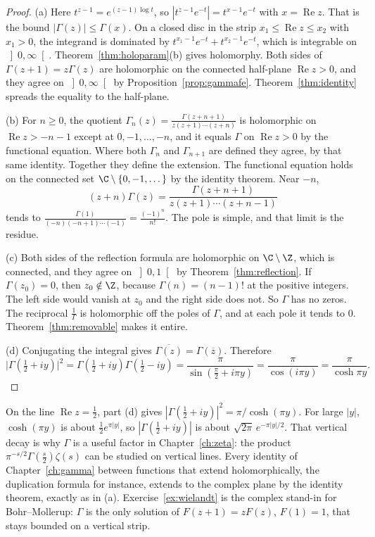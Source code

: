 \begin{proof}
(a) Here $t^{z-1}=e^{(z-1)\log t}$, so $|t^{z-1}e^{-t}|=t^{x-1}e^{-t}$ with $x=\operatorname{Re}z$. That is the bound $|\Gamma(z)|\le\Gamma(x)$. On a closed disc in the strip $x_1\le\operatorname{Re}z\le x_2$ with $x_1>0$, the integrand is dominated by $t^{x_1-1}e^{-t}+t^{x_2-1}e^{-t}$, which is integrable on $\left]0,\infty\right[$. Theorem~\ref{thm:holoparam}(b) gives holomorphy. Both sides of $\Gamma(z+1)=z\Gamma(z)$ are holomorphic on the connected half-plane $\operatorname{Re}z>0$, and they agree on $\left]0,\infty\right[$ by Proposition~\ref{prop:gammafe}. Theorem~\ref{thm:identity} spreads the equality to the half-plane.

(b) For $n\ge0$, the quotient $\Gamma_n(z)=\frac{\Gamma(z+n+1)}{z(z+1)\cdots(z+n)}$ is holomorphic on $\operatorname{Re}z>-n-1$ except at $0,-1,\dots,-n$, and it equals $\Gamma$ on $\operatorname{Re}z>0$ by the functional equation. Where both $\Gamma_n$ and $\Gamma_{n+1}$ are defined they agree, by that same identity. Together they define the extension. The functional equation holds on the connected set $\C\setminus\{0,-1,\dots\}$ by the identity theorem. Near $-n$,
\[
(z+n)\Gamma(z)=\frac{\Gamma(z+n+1)}{z(z+1)\cdots(z+n-1)}
\]
tends to $\frac{\Gamma(1)}{(-n)(-n+1)\cdots(-1)}=\frac{(-1)^n}{n!}$. The pole is simple, and that limit is the residue.

(c) Both sides of the reflection formula are holomorphic on $\C\setminus\Z$, which is connected, and they agree on $\left]0,1\right[$ by Theorem~\ref{thm:reflection}. If $\Gamma(z_0)=0$, then $z_0\notin\Z$, because $\Gamma(n)=(n-1)!$ at the positive integers. The left side would vanish at $z_0$ and the right side does not. So $\Gamma$ has no zeros. The reciprocal $\frac1\Gamma$ is holomorphic off the poles of $\Gamma$, and at each pole it tends to $0$. Theorem~\ref{thm:removable} makes it entire.

(d) Conjugating the integral gives $\overline{\Gamma(z)}=\Gamma(\overline z)$. Therefore
\[
\bigl|\Gamma(\tfrac12+iy)\bigr|^2=\Gamma(\tfrac12+iy)\Gamma(\tfrac12-iy)=\frac\pi{\sin(\frac\pi2+i\pi y)}=\frac\pi{\cos(i\pi y)}=\frac\pi{\cosh\pi y}.
\]
\end{proof}

On the line $\operatorname{Re}z=\frac12$, part (d) gives $|\Gamma(\frac12+iy)|^2=\pi/\cosh(\pi y)$. For large $|y|$, $\cosh(\pi y)$ is about $\frac12 e^{\pi|y|}$, so $|\Gamma(\frac12+iy)|$ is about $\sqrt{2\pi}\,e^{-\pi|y|/2}$. That vertical decay is why $\Gamma$ is a useful factor in Chapter~\ref{ch:zeta}: the product $\pi^{-s/2}\Gamma(\frac s2)\zeta(s)$ can be studied on vertical lines. Every identity of Chapter~\ref{ch:gamma} between functions that extend holomorphically, the duplication formula for instance, extends to the complex plane by the identity theorem, exactly as in (a). Exercise~\ref{ex:wielandt} is the complex stand-in for Bohr--Mollerup: $\Gamma$ is the only solution of $F(z+1)=zF(z)$, $F(1)=1$, that stays bounded on a vertical strip.

